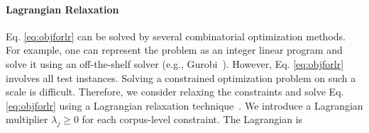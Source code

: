 \paragraph{Lagrangian Relaxation}
Eq. \eqref{eq:objforlr} can be solved by several combinatorial optimization methods. For example, one can represent the problem as an integer linear program and solve it using an off-the-shelf solver (e.g., Gurobi~\cite{gurobi}). However, Eq. \eqref{eq:objforlr} involves all test instances. Solving a constrained optimization problem on such a scale is difficult. Therefore, we consider relaxing the constraints and solve Eq. \eqref{eq:objforlr} using a
Lagrangian relaxation technique~\cite{Rush2012}. 
We introduce a Lagrangian multiplier $\lambda_j \geq 0$ for each corpus-level constraint. The Lagrangian is
